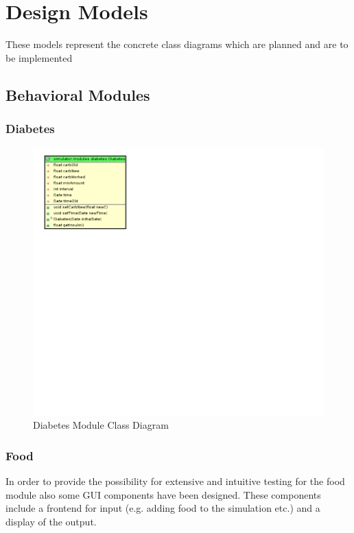 \section{Design Models}
These models represent the concrete class diagrams which are planned and are to
be implemented

\subsection{Behavioral Modules}

\subsubsection{Diabetes}

\begin{figure}[htb]
\centering
\includegraphics[width=\textwidth]{images/diabetes_class_diagram.png}
\caption{Diabetes Module Class Diagram}
\label{fig:diabetes_module_class_diagram}
\end{figure}

\subsubsection{Food}
In order to provide the possibility for extensive and intuitive testing for the
food module also some GUI components have been designed.
These components include a frontend for input (e.g. adding food to the
simulation etc.) and a display of the output.

